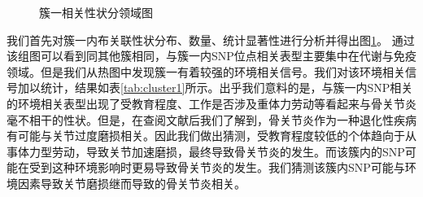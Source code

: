 \begin{figure}[htbp]
\centering
{}
\caption{簇一相关性状分领域图}
\label{fig:cluster1}
\end{figure}

我们首先对簇一内布关联性状分布、数量、统计显著性进行分析并得出图\ref{fig:cluster1}。
通过该组图可以看到同其他簇相同，与簇一内SNP位点相关表型主要集中在代谢与免疫领域。但是我们从热图中发现簇一有着较强的环境相关信号。我们对该环境相关信号加以统计，结果如表\ref{tab:cluster1}所示。出乎我们意料的是，与簇一内SNP相关的环境相关表型出现了受教育程度、工作是否涉及重体力劳动等看起来与骨关节炎毫不相干的性状。但是，在查阅文献\cite{jensen_hip_2008}后我们了解到，骨关节炎作为一种退化性疾病有可能与关节过度磨损相关。因此我们做出猜测，受教育程度较低的个体趋向于从事体力型劳动，导致关节加速磨损，最终导致骨关节炎的发生。而该簇内的SNP可能在受到这种环境影响时更易导致骨关节炎的发生。我们猜测该簇内SNP可能与环境因素导致关节磨损继而导致的骨关节炎相关。

